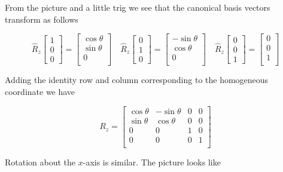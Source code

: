 \documentclass[12pt]{article}
\newcommand{\nin}{\noindent}
\newcommand{\vthree}{\vspace{3mm}}
\newcommand{\mymat}[1]{
\left[
\begin{array}{rrrrrrrrrrrrrrrrrrrrrrrrrrrrrrrrrrrrrrr}
#1
\end{array}
\right]
}
\begin{document}
\vthree

\nin From the picture and a little trig we see that the canonical basis vectors transform as follows

\[
\hat{R}_z\mymat{
1 \\
0 \\
0
}
=
\mymat{
\cos\theta \\
\sin\theta \\
0 \\
}
\quad
\hat{R}_z\mymat{
0 \\
1 \\
0
}
=
\mymat{
-\sin\theta \\
\cos\theta \\
0 \\
}
\quad
\hat{R}_z\mymat{
0 \\
0 \\
1
}
=
\mymat{
0 \\
0 \\
1 \\
}
\]

\clearpage

\nin Adding the identity row and column corresponding to the homogeneous coordinate we have

\[
R_z =
\mymat{
\cos\theta & -\sin\theta & 0 & 0 \\
\sin\theta &  \cos\theta & 0 & 0 \\
0 & 0 & 1 & 0 \\
0 & 0 & 0 & 1 \\
}
\]

\vthree

\nin Rotation about the $x$-axis is similar.  The picture looks like

\vspace{10mm}
\end{document}
